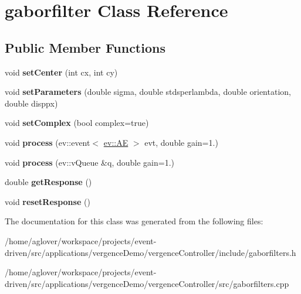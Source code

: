 \hypertarget{classgaborfilter}{}\section{gaborfilter Class Reference}
\label{classgaborfilter}
\subsection*{Public Member Functions}
\begin{DoxyCompactItemize}
\item 
void {\bfseries set\+Center} (int cx, int cy)\hypertarget{classgaborfilter_ab851caaccfdec1ed1d1d49a93b5474a3}{}\label{classgaborfilter_ab851caaccfdec1ed1d1d49a93b5474a3}

\item 
void {\bfseries set\+Parameters} (double sigma, double stdsperlambda, double orientation, double disppx)\hypertarget{classgaborfilter_af246a88ffb2219f4a08bba2449f03d4c}{}\label{classgaborfilter_af246a88ffb2219f4a08bba2449f03d4c}

\item 
void {\bfseries set\+Complex} (bool complex=true)\hypertarget{classgaborfilter_a8b0747961e18733e0f6c266ef76f27f6}{}\label{classgaborfilter_a8b0747961e18733e0f6c266ef76f27f6}

\item 
void {\bfseries process} (ev\+::event$<$ \hyperlink{classev_1_1AddressEvent}{ev\+::\+AE} $>$ evt, double gain=1.)\hypertarget{classgaborfilter_adbaa9f07c4bf3afc550bdc34fab762a1}{}\label{classgaborfilter_adbaa9f07c4bf3afc550bdc34fab762a1}

\item 
void {\bfseries process} (ev\+::v\+Queue \&q, double gain=1.)\hypertarget{classgaborfilter_ac92cb33f0d1a179a1b023f4f06d625f1}{}\label{classgaborfilter_ac92cb33f0d1a179a1b023f4f06d625f1}

\item 
double {\bfseries get\+Response} ()\hypertarget{classgaborfilter_a5db2373d31fb563fd560f7e1638f7af2}{}\label{classgaborfilter_a5db2373d31fb563fd560f7e1638f7af2}

\item 
void {\bfseries reset\+Response} ()\hypertarget{classgaborfilter_af3fec16a09439bf76c3df196285a28c0}{}\label{classgaborfilter_af3fec16a09439bf76c3df196285a28c0}

\end{DoxyCompactItemize}


The documentation for this class was generated from the following files\+:\begin{DoxyCompactItemize}
\item 
/home/aglover/workspace/projects/event-\/driven/src/applications/vergence\+Demo/vergence\+Controller/include/gaborfilters.\+h\item 
/home/aglover/workspace/projects/event-\/driven/src/applications/vergence\+Demo/vergence\+Controller/src/gaborfilters.\+cpp\end{DoxyCompactItemize}
